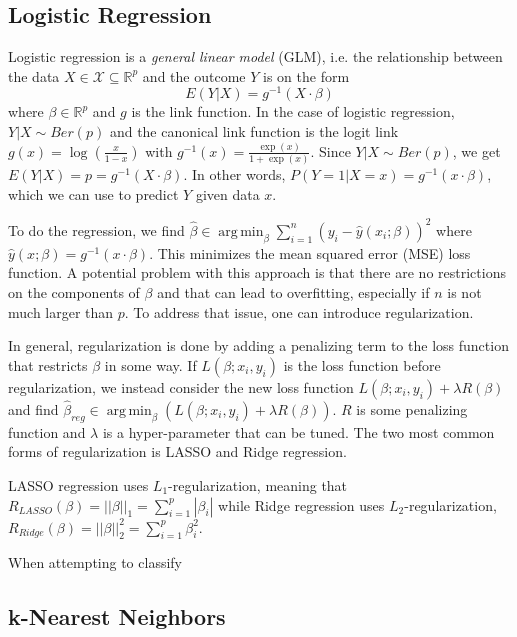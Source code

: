 \documentclass{article}
\DeclareMathOperator*{\argmin}{arg\,min}
\begin{document}
\subsection{Logistic Regression}
Logistic regression is a \textit{general linear model} (GLM), i.e. the relationship between the data $X \in \mathcal{X} \subseteq \mathbb{R}^p$ and the outcome $Y$ is on the form
\begin{equation}
	E(Y|X) = g^{-1}(X \cdot \beta)
\end{equation}
where $\beta \in \mathbb{R}^p$ and $g$ is the link function. In the case of logistic regression, $Y|X \sim Ber(p)$ and the canonical link function is the logit link $g(x) = \log \left( \frac{x}{1 - x} \right)$ with $g^{-1}(x) = \frac{\exp(x)}{1 + \exp(x)}$. Since $Y|X \sim Ber(p)$, we get $E(Y|X) = p = g^{-1}(X \cdot \beta)$. In other words, $P(Y = 1 | X = x) = g^{-1}(x \cdot \beta)$, which we can use to predict $Y$ given data $x$.

To do the regression, we find $\hat \beta \in \argmin_\beta \sum_{i=1}^{n} (y_i - \hat y(x_i; \beta))^2$ where $\hat y(x;\beta) = g^{-1} (x \cdot \beta)$. This minimizes the mean squared error (MSE) loss function. A potential problem with this approach is that there are no restrictions on the components of $\beta$ and that can lead to overfitting, especially if $n$ is not much larger than $p$. To address that issue, one can introduce regularization.

In general, regularization is done by adding a penalizing term to the loss function that restricts $\beta$ in some way. If $L(\beta; x_i,y_i)$ is the loss function before regularization, we instead consider the new loss function $L(\beta; x_i,y_i) + \lambda R(\beta)$ and find $\hat \beta_{reg} \in \argmin_\beta \left( L(\beta; x_i, y_i) + \lambda R(\beta) \right)$. $R$ is some penalizing function and $\lambda$ is a hyper-parameter that can be tuned. The two most common forms of regularization is LASSO and Ridge regression.

LASSO regression uses $L_1$-regularization, meaning that $R_{LASSO}(\beta) = ||\beta||_1 =  \sum_{i=1}^{p} |\beta_i|$ while Ridge regression uses $L_2$-regularization, $R_{Ridge}(\beta) = ||\beta||_2^2 = \sum_{i=1}^{p} \beta_i^2$.

When attempting to classify 

\subsection{k-Nearest Neighbors}
\end{document}
